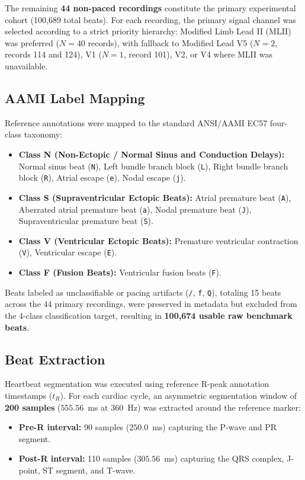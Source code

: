 \documentclass[conference]{IEEEtran}
\begin{document}
The remaining \textbf{44 non-paced recordings} constitute the primary experimental cohort (100,689 total beats). For each recording, the primary signal channel was selected according to a strict priority hierarchy: Modified Limb Lead II (MLII) was preferred ($N=40$ records), with fallback to Modified Lead V5 ($N=2$, records 114 and 124), V1 ($N=1$, record 101), V2, or V4 where MLII was unavailable.

\subsection{AAMI Label Mapping}
Reference annotations were mapped to the standard ANSI/AAMI EC57 four-class taxonomy:
\begin{itemize}
    \item \textbf{Class N (Non-Ectopic / Normal Sinus and Conduction Delays):} Normal sinus beat (\texttt{N}), Left bundle branch block (\texttt{L}), Right bundle branch block (\texttt{R}), Atrial escape (\texttt{e}), Nodal escape (\texttt{j}).
    \item \textbf{Class S (Supraventricular Ectopic Beats):} Atrial premature beat (\texttt{A}), Aberrated atrial premature beat (\texttt{a}), Nodal premature beat (\texttt{J}), Supraventricular premature beat (\texttt{S}).
    \item \textbf{Class V (Ventricular Ectopic Beats):} Premature ventricular contraction (\texttt{V}), Ventricular escape (\texttt{E}).
    \item \textbf{Class F (Fusion Beats):} Ventricular fusion beats (\texttt{F}).
\end{itemize}
Beats labeled as unclassifiable or pacing artifacts (\texttt{/}, \texttt{f}, \texttt{Q}), totaling 15 beats across the 44 primary recordings, were preserved in metadata but excluded from the 4-class classification target, resulting in \textbf{100,674 usable raw benchmark beats}.

\subsection{Beat Extraction}
Heartbeat segmentation was executed using reference R-peak annotation timestamps ($t_R$). For each cardiac cycle, an asymmetric segmentation window of \textbf{200 samples} ($555.56$~ms at 360~Hz) was extracted around the reference marker:
\begin{itemize}
    \item \textbf{Pre-R interval:} 90 samples ($250.0$~ms) capturing the P-wave and PR segment.
    \item \textbf{Post-R interval:} 110 samples ($305.56$~ms) capturing the QRS complex, J-point, ST segment, and T-wave.
\end{itemize}
\end{document}
